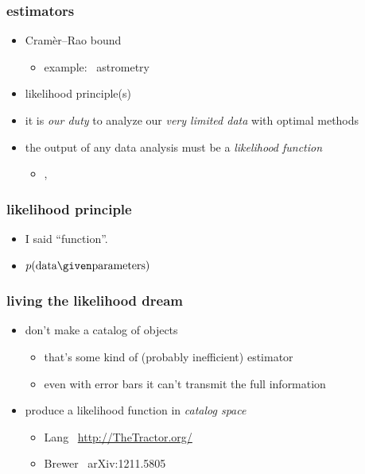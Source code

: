 \documentclass[pdftex]{beamer}
\newcommand{\data}{\mbox{data}}
\newcommand{\pars}{\mbox{parameters}}
\begin{document}
\begin{frame}
  \frametitle{estimators}
  \begin{itemize}
  \item Cram\`er--Rao bound
    \begin{itemize}
    \item example: \gaia\ astrometry
    \end{itemize}
  \item likelihood principle(s)
  \item it is \emph{our duty} to analyze our \emph{very limited data} with optimal methods
  \item the output of any data analysis must be a \emph{likelihood function}
    \begin{itemize}
    \item {}, 
    \end{itemize}
  \end{itemize}
\end{frame}

\begin{frame}
  \frametitle{likelihood principle}
  \begin{itemize}
  \item I said ``function''.
  \item $p(\data\given\pars)$
  \end{itemize}
\end{frame}

\begin{frame}
  \frametitle{living the likelihood dream}
  \begin{itemize}
  \item don't make a catalog of objects
    \begin{itemize}
    \item that's some kind of (probably inefficient) estimator
    \item even with error bars it can't transmit the full information
    \end{itemize}
  \item produce a likelihood function in \emph{catalog space}
    \begin{itemize}
    \item Lang \etal\ \url{http://TheTractor.org/}
    \item Brewer \etal\ arXiv:1211.5805
    \end{itemize}
  \end{itemize}
\end{frame}
\end{document}
